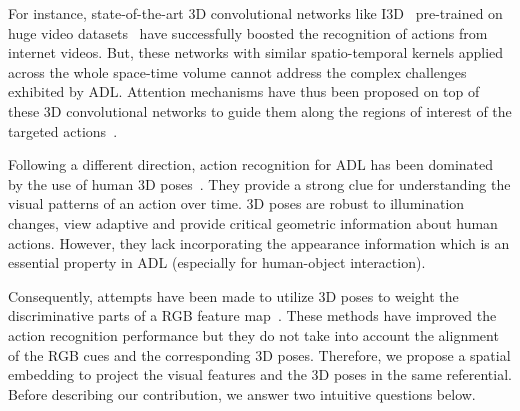 \documentclass[runningheads]{llncs}
\begin{document}
For instance, state-of-the-art 3D convolutional networks like I3D~\cite{i3d} pre-trained on huge video datasets~\cite{kinetics,ucf,kuehne2011hmdb} have successfully boosted the recognition of actions from internet videos. But, these networks with similar spatio-temporal kernels applied across the whole space-time volume cannot address the complex challenges exhibited by ADL. Attention mechanisms have thus been proposed on top of these 3D convolutional networks to guide them along the regions of interest of the targeted actions~\cite{nonlocal,timeception,video_transformer_network}. 
\iffalse
 3D poses for action recognition provide a strong clue for understanding the visual patterns of an action over time. 3D poses are robust to illumination changes, view adaptive and provide critical geometric information about human actions. Many skeleton based action recognition models have been proposed in the literature~\cite{gemetricfeaturesWACV2017,valstm}. However, they lack incorporating the appearance information which is an essential property in ADL (specifically for human-object interaction). Consequently, attempts have been made to utilize 3D poses to weight the discriminative parts of a CNN feature map~\cite{Baradel_BMVC,glimpse,STA-hands,spatial-i3d,STA_iccv}. These methods have improved the action recognition performance but they do not take into account the alignment of the RGB cues and the corresponding 3D poses. Therefore, we propose a spatial embedding to project the visual features and the 3D poses in the same referential. Before describing our contribution, we answer two intuitive questions below.
 \fi
  Following a different direction, action recognition for ADL has been dominated by the use of human 3D poses~\cite{gemetricfeaturesWACV2017,valstm}.
  They provide a strong clue for understanding the visual patterns of an action over time. 3D poses are robust to illumination changes, view adaptive and provide critical geometric information about human actions. However, they lack incorporating the appearance information which is an essential property in ADL (especially for human-object interaction).
  
  Consequently, attempts have been made to utilize 3D poses to weight the discriminative parts of a RGB feature map~\cite{Baradel_BMVC,glimpse,STA-hands,spatial-i3d,STA_iccv}. These methods have improved the action recognition performance but they do not take into account the alignment of the RGB cues and the corresponding 3D poses. Therefore, we propose a spatial embedding to project the visual features and the 3D poses in the same referential. Before describing our contribution, we answer two intuitive questions below.
\end{document}

